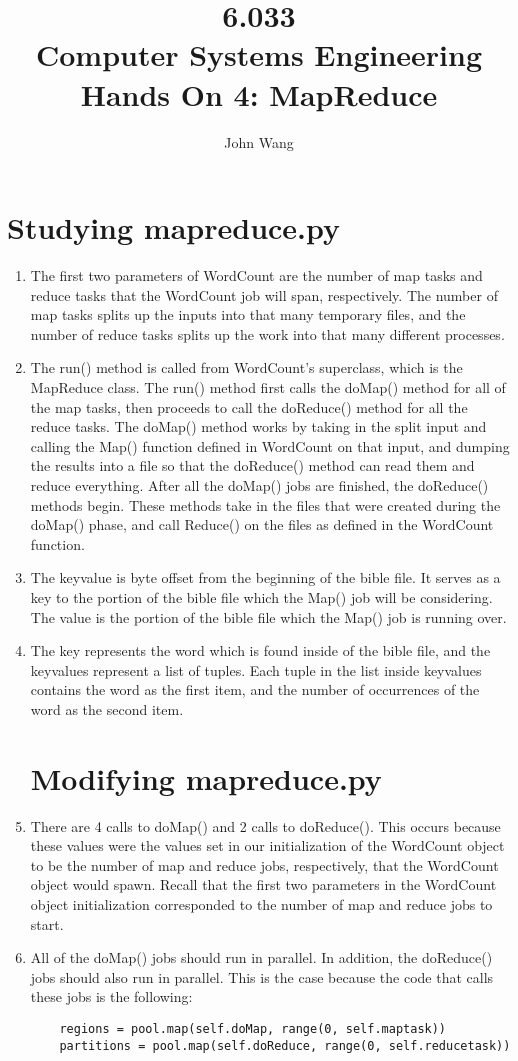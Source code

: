\documentclass[psamsfonts]{amsart}
\title{6.033 \\
Computer Systems Engineering \\
Hands On 4: MapReduce}
\author{John Wang}
\begin{document}
\maketitle

\section{Studying mapreduce.py}

\begin{enumerate}
  \item The first two parameters of WordCount are the number of map tasks and reduce tasks that the WordCount job will span, respectively. The number of map tasks splits up the inputs into that many temporary files, and the number of reduce tasks splits up the work into that many different processes.
  \item The run() method is called from WordCount's superclass, which is the MapReduce class. The run() method first calls the doMap() method for all of the map tasks, then proceeds to call the doReduce() method for all the reduce tasks. The doMap() method works by taking in the split input and calling the Map() function defined in WordCount on that input, and dumping the results into a file so that the doReduce() method can read them and reduce everything. After all the doMap() jobs are finished, the doReduce() methods begin. These methods take in the files that were created during the doMap() phase, and call Reduce() on the files as defined in the WordCount function.
  \item The keyvalue is byte offset from the beginning of the bible file. It serves as a key to the portion of the bible file which the Map() job will be considering. The value is the portion of the bible file which the Map() job is running over.
  \item The key represents the word which is found inside of the bible file, and the keyvalues represent a list of tuples. Each tuple in the list inside keyvalues contains the word as the first item, and the number of occurrences of the word as the second item.

\section{Modifying mapreduce.py}
  \item There are 4 calls to doMap() and 2 calls to doReduce(). This occurs because these values were the values set in our initialization of the WordCount object to be the number of map and reduce jobs, respectively, that the WordCount object would spawn. Recall that the first two parameters in the WordCount object initialization corresponded to the number of map and reduce jobs to start.
  \item All of the doMap() jobs should run in parallel. In addition, the doReduce() jobs should also run in parallel. This is the case because the code that calls these jobs is the following:
    \begin{verbatim}
    regions = pool.map(self.doMap, range(0, self.maptask))
    partitions = pool.map(self.doReduce, range(0, self.reducetask))
    \end{verbatim}


\end{enumerate}
\end{document}
